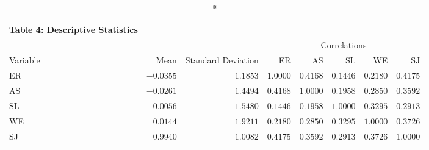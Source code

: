 \begin{longtable}{lrrrrrrr}
\caption*{
{\large Table 4: Descriptive Statistics}
} \\ 
\toprule
 &  &  & \multicolumn{5}{c}{Correlations} \\ 
\cmidrule(lr){4-8}
Variable & Mean & Standard Deviation & ER & AS & SL & WE & SJ \\ 
\midrule
ER & $-0.0355$ & $1.1853$ & $1.0000$ & $0.4168$ & $0.1446$ & $0.2180$ & $0.4175$ \\ 
AS & $-0.0261$ & $1.4494$ & $0.4168$ & $1.0000$ & $0.1958$ & $0.2850$ & $0.3592$ \\ 
SL & $-0.0056$ & $1.5480$ & $0.1446$ & $0.1958$ & $1.0000$ & $0.3295$ & $0.2913$ \\ 
WE & $0.0144$ & $1.9211$ & $0.2180$ & $0.2850$ & $0.3295$ & $1.0000$ & $0.3726$ \\ 
SJ & $0.9940$ & $1.0082$ & $0.4175$ & $0.3592$ & $0.2913$ & $0.3726$ & $1.0000$ \\ 
\bottomrule
\end{longtable}

